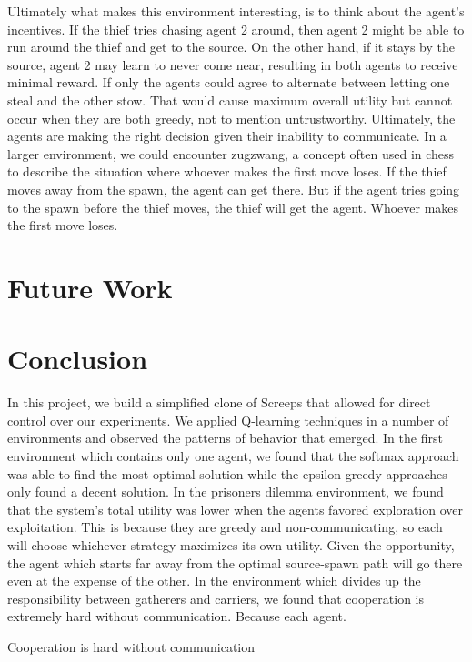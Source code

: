 \documentclass[11pt]{article}
\begin{document}
Ultimately what makes this environment interesting, is to think about the agent's incentives. If the thief tries chasing agent 2 around, then agent 2 might be able to run around the thief and get to the source. On the other hand, if it stays by the source, agent 2 may learn to never come near, resulting in both agents to receive minimal reward. If only the agents could agree to alternate between letting one steal and the other stow. That would cause maximum overall utility but cannot occur when they are both greedy, not to mention untrustworthy. Ultimately, the agents are making the right decision given their inability to communicate. In a larger environment, we could encounter zugzwang, a concept often used in chess to describe the situation where whoever makes the first move loses. If the thief moves away from the spawn, the agent can get there. But if the agent tries going to the spawn before the thief moves, the thief will get the agent. Whoever makes the first move loses.

\section{Future Work}

\section{Conclusion}

	In this project, we build a simplified clone of Screeps that allowed for direct control over our experiments. We applied Q-learning techniques in a number of environments and observed the patterns of behavior that emerged. In the first environment which contains only one agent, we found that the softmax approach was able to find the most optimal solution while the epsilon-greedy approaches only found a decent solution. In the prisoners dilemma environment, we found that the system's total utility was lower when the agents favored exploration over exploitation. This is because they are greedy and non-communicating, so each will choose whichever strategy maximizes its own utility. Given the opportunity, the agent which starts far away from the optimal source-spawn path will go there even at the expense of the other. 
	In the environment which divides up the responsibility between gatherers and carriers, we found that cooperation is extremely hard without communication. Because each agent.

Cooperation is hard without communication
\end{document}
